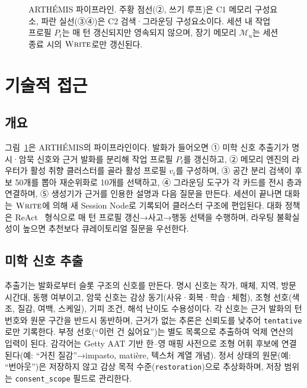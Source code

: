 \documentclass[10pt,twocolumn,letterpaper]{article}
\newcommand{\cM}{\mathcal{M}}
\newcommand{\op}[1]{\textsc{#1}}
\begin{document}
\begin{figure}[t]
\caption{ARTHÉMIS 파이프라인. 주황 점선(②, 쓰기 루프)은 C1 메모리 구성요소, 파란 실선(③④)은 C2 검색·그라운딩 구성요소이다. 세션 내 작업 프로필 $P_t$는 매 턴 갱신되지만 영속되지 않으며, 장기 메모리 $\cM_u$는 세션 종료 시의 $\op{Write}$로만 갱신된다.}
\label{fig:pipeline}
\end{figure}

\section{기술적 접근}

\subsection{개요}
그림~\ref{fig:pipeline}은 ARTHÉMIS의 파이프라인이다. 발화가 들어오면 ① 미학 신호 추출기가 명시·암묵 신호와 근거 발화를 분리해 작업 프로필 $P_t$를 갱신하고, ② 메모리 엔진의 라우터가 활성 취향 클러스터를 골라 활성 프로필 $v_t$를 구성하며, ③ 공간 분리 검색이 후보 50개를 뽑아 재순위화로 10개를 선택하고, ④ 그라운딩 도구가 각 카드를 전시 층과 연결하며, ⑤ 생성기가 근거를 인용한 설명과 다음 질문을 만든다. 세션이 끝나면 대화는 $\op{Write}$에 의해 새 Session Node로 기록되어 클러스터 구조에 편입된다. 대화 정책은 ReAct~\cite{yao2023react} 형식으로 매 턴 프로필 갱신→사고→행동 선택을 수행하며, 라우팅 불확실성이 높으면 추천보다 큐레이토리얼 질문을 우선한다.

\subsection{미학 신호 추출}
추출기는 발화로부터 슬롯 구조의 신호를 만든다. 명시 신호는 작가, 매체, 지역, 방문 시간대, 동행 여부이고, 암묵 신호는 감상 동기(사유·회복·학습·체험), 조형 선호(색조, 질감, 여백, 스케일), 기피 조건, 해석 난이도 수용성이다. 각 신호는 근거 발화의 턴 번호와 원문 구간을 반드시 동반하며, 근거가 없는 추론은 신뢰도를 낮추어 \texttt{tentative}로만 기록한다. 부정 선호(``이런 건 싫어요'')는 별도 목록으로 추출하여 억제 연산의 입력이 된다. 감각어는 Getty AAT 기반 한–영 매핑 사전으로 조형 어휘 후보에 연결된다(예: ``거친 질감''→impasto, matière, 텍스처 계열 개념). 정서 상태의 원문(예: ``번아웃'')은 저장하지 않고 감상 목적 수준(\texttt{restoration})으로 추상화하며, 저장 범위는 \texttt{consent\_scope} 필드로 관리한다.
\end{document}
